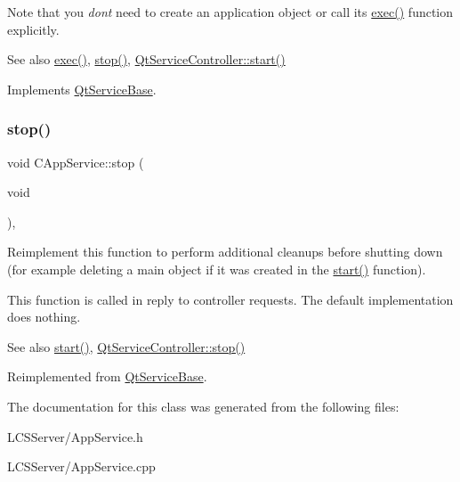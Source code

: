 Note that you {\itshape don\textquotesingle{}t} need to create an application object or call its \hyperlink{class_qt_service_base_afae2e589de71c1ae3ae8db3dc9ab9c64}{exec()} function explicitly.

\begin{DoxySeeAlso}{See also}
\hyperlink{class_qt_service_base_afae2e589de71c1ae3ae8db3dc9ab9c64}{exec()}, \hyperlink{class_c_app_service_a1090ba3b5428c97b01f7561c5e2bcb74}{stop()}, \hyperlink{class_qt_service_controller_a5e9d6da5081d70f31611456d0ef0687e}{Qt\+Service\+Controller\+::start()} 
\end{DoxySeeAlso}


Implements \hyperlink{class_qt_service_base_adbc0cd621b41bd3a6a1f62fda432e9e4}{Qt\+Service\+Base}.

\mbox{\label{class_c_app_service_a1090ba3b5428c97b01f7561c5e2bcb74}} 
\subsubsection{\texorpdfstring{stop()}{stop()}}
{\footnotesize\ttfamily void C\+App\+Service\+::stop (\begin{DoxyParamCaption}\item[{void}]{ }\end{DoxyParamCaption})\hspace{0.3cm}{\ttfamily [protected]}, {\ttfamily [virtual]}}

Reimplement this function to perform additional cleanups before shutting down (for example deleting a main object if it was created in the \hyperlink{class_c_app_service_a9a949fe52710476fa08f64fd6b146e6b}{start()} function).

This function is called in reply to controller requests. The default implementation does nothing.

\begin{DoxySeeAlso}{See also}
\hyperlink{class_c_app_service_a9a949fe52710476fa08f64fd6b146e6b}{start()}, \hyperlink{class_qt_service_controller_ad06afa647666769e309474b18bf7cf90}{Qt\+Service\+Controller\+::stop()} 
\end{DoxySeeAlso}


Reimplemented from \hyperlink{class_qt_service_base_a8d52c1b8fd06b50bdc0a0c6f9936a68e}{Qt\+Service\+Base}.



The documentation for this class was generated from the following files\+:\begin{DoxyCompactItemize}
\item 
L\+C\+S\+Server/App\+Service.\+h\item 
L\+C\+S\+Server/App\+Service.\+cpp\end{DoxyCompactItemize}
